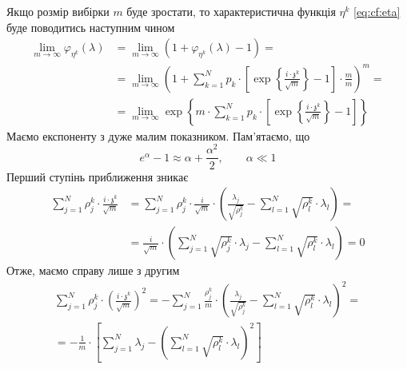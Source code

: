 Якщо розмір вибірки $m$ буде зростати, то характеристична функція $\eta^k$
\eqref{eq:cf:eta} буде поводитись наступним чином
\begin{equation*}
  \begin{split}
    \lim_{m \to \infty} \varphi_{\eta^k}\left( \lambda \right)
    &= \lim_{m \to \infty} \left(
      1 + \varphi_{\eta^k}\left( \lambda \right) - 1 \right) = \\
    &= \lim_{m \to \infty} \left( 1 + \sum_{k=1}^{N} p_k \cdot \left[
      \exp{\left\{ \frac{i \cdot \mathfrak{z}^k}{\sqrt{m}} \right\}}
      - 1 \right] \cdot \frac{m}{m} \right)^m = \\
    &= \lim_{m \to \infty} \exp{ \left\{ m \cdot \sum_{k=1}^{N} p_k \cdot \left[
      \exp{\left\{ \frac{i \cdot \mathfrak{z}^k}{\sqrt{m}} \right\}}
      - 1 \right] \right\}}
  \end{split}
\end{equation*}
Маємо експоненту з дуже малим показником. Пам’ятаємо, що
\begin{equation*}
  e^{\alpha} - 1 \approx \alpha + \frac{\alpha^2}{2},\qquad \alpha \ll 1
\end{equation*}
Перший ступінь приближення зникає
\begin{equation*}
  \begin{split}
    \sum_{j=1}^{N} \rho_j^k \cdot \frac{i \cdot \mathfrak{z}^k}{\sqrt{m}}
    &= \sum_{j=1}^{N} \rho_j^k \cdot \frac{i}{\sqrt{m}}
      \cdot \left( \frac{\lambda_j}{\sqrt{\rho_j^k}}
        - \sum_{l=1}^{N} \sqrt{\rho_l^k} \cdot \lambda_l \right) = \\
    &= \frac{i}{\sqrt{m}} \cdot \left(
      \sum_{j=1}^{N} \sqrt{\rho_j^k} \cdot \lambda_j
      - \sum_{l=1}^{N} \sqrt{\rho_l^k} \cdot \lambda_l \right)
    = 0
  \end{split}
\end{equation*}
Отже, маємо справу лише з другим
\begin{equation*}
  \begin{split}
    \sum_{j=1}^{N} \rho_j^k
      \cdot \left( \frac{i \cdot \mathfrak{z}^k}{\sqrt{m}} \right)^2
      = - \sum_{j=1}^{N} \frac{\rho_j^k}{m}
        \cdot \left( \frac{\lambda_j}{\sqrt{\rho_j^k}}
          - \sum_{l=1}^{N} \sqrt{\rho_l^k} \cdot \lambda_l \right)^2 = \\
      = - \frac{1}{m} \cdot \left[ \sum_{j=1}^{N} \lambda_j
        - \left( \sum_{l=1}^{N} \sqrt{\rho_l^k} \cdot \lambda_l \right)^2
          \right]
  \end{split}
\end{equation*}
